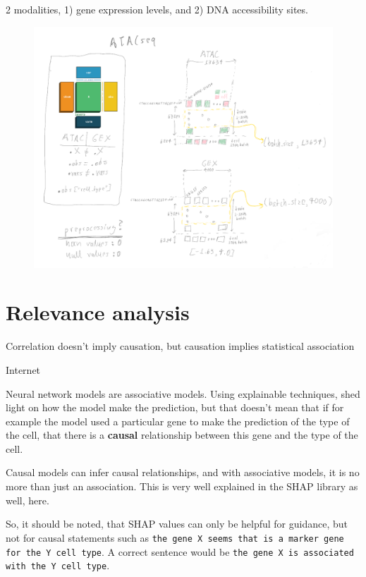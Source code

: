 \documentclass[12pt, a4paper]{article}
\begin{document}
2 modalities, 1) gene expression levels, and 2) DNA accessibility sites.


\begin{figure}[h!]
  \centering
  \includegraphics[width=\textwidth]{atac.png}
  \caption{}
\end{figure}

\clearpage



\section{Relevance analysis}
\label{sec:relevance}


\epigraph{Correlation doesn't imply causation, but causation implies statistical association}{Internet}

Neural network models are associative models. Using explainable techniques, shed light on how the model make the prediction, but that doesn't mean that if for example the model used a particular gene to make the prediction of the type of the cell, that there is a \textbf{causal} relationship between this gene and the type of the cell. 

Causal models can infer causal relationships, and with associative models, it is no more than just an association. This is very well explained in the SHAP library as well, here.

So, it should be noted, that SHAP values can only be helpful for guidance, but not for causal statements such as \verb|the gene X seems that is a marker gene for the Y cell type|. A correct sentence would be \verb|the gene X is associated with the Y cell type|.
\end{document}
